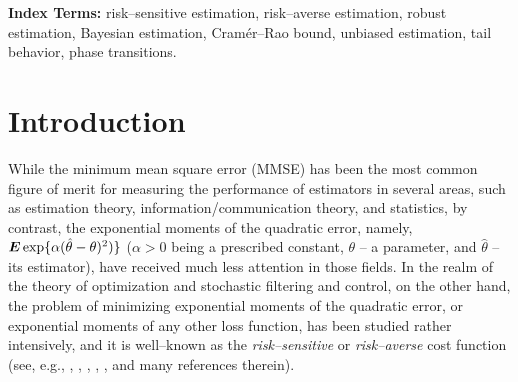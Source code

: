 \documentclass[11pt,epsf]{article}
\newcommand{\ct}{\hat{\theta}}
\newcommand {\bE} {\mbox{\boldmath $E$}}
\begin{document}
\vspace{0.2cm}

\noindent
{\bf Index Terms:} risk--sensitive estimation, risk--averse estimation, robust
estimation, Bayesian estimation,
Cram\'er--Rao bound, unbiased estimation, tail behavior, phase transitions.

\setlength{\baselineskip}{1.5\baselineskip}
\newpage

\section{Introduction}

While the minimum mean square error (MMSE) has been
the most common figure of merit for measuring the performance 
of estimators in several areas, such as 
estimation theory, information/communication theory,
and statistics, by contrast, the exponential moments of the quadratic error,
namely, $\bE\exp\{\alpha(\ct-\theta)^2)\}$ ($\alpha > 0$ being a prescribed
constant, $\theta$ -- a parameter, and $\ct$ -- its estimator), have received much less
attention in those fields.
In the realm of the theory of
optimization and stochastic filtering 
and control, on the other hand, the problem of
minimizing exponential
moments of the quadratic error, 
or exponential moments of any other loss function, 
has been studied rather intensively, and it is well--known as the {\it
risk--sensitive} or {\it risk--averse} cost function (see, e.g.,
\cite{DPMR96}, \cite{DMS99},
\cite{FHH97}, \cite{HM72}, \cite{Whittle81}, \cite{Whittle90} and many
references therein). 
\end{document}
